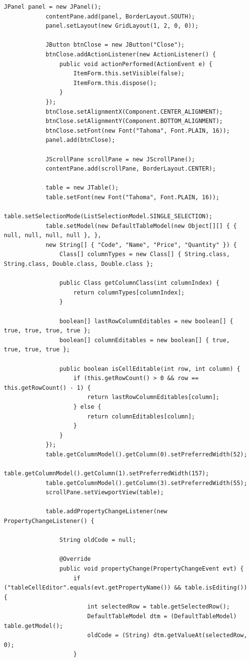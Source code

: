 \begin{lstlisting}[style=JavaStyle]
			JPanel panel = new JPanel();
			contentPane.add(panel, BorderLayout.SOUTH);
			panel.setLayout(new GridLayout(1, 2, 0, 0));
			
			JButton btnClose = new JButton("Close");
			btnClose.addActionListener(new ActionListener() {
				public void actionPerformed(ActionEvent e) {
					ItemForm.this.setVisible(false);
					ItemForm.this.dispose();
				}
			});
			btnClose.setAlignmentX(Component.CENTER_ALIGNMENT);
			btnClose.setAlignmentY(Component.BOTTOM_ALIGNMENT);
			btnClose.setFont(new Font("Tahoma", Font.PLAIN, 16));
			panel.add(btnClose);
			
			JScrollPane scrollPane = new JScrollPane();
			contentPane.add(scrollPane, BorderLayout.CENTER);
			
			table = new JTable();
			table.setFont(new Font("Tahoma", Font.PLAIN, 16));
			table.setSelectionMode(ListSelectionModel.SINGLE_SELECTION);
			table.setModel(new DefaultTableModel(new Object[][] { { null, null, null, null }, },
			new String[] { "Code", "Name", "Price", "Quantity" }) {
				Class[] columnTypes = new Class[] { String.class, String.class, Double.class, Double.class };
				
				public Class getColumnClass(int columnIndex) {
					return columnTypes[columnIndex];
				}
				
				boolean[] lastRowColumnEditables = new boolean[] { true, true, true, true };
				boolean[] columnEditables = new boolean[] { true, true, true, true };
				
				public boolean isCellEditable(int row, int column) {
					if (this.getRowCount() > 0 && row == this.getRowCount() - 1) {
						return lastRowColumnEditables[column];
					} else {
						return columnEditables[column];
					}
				}
			});
			table.getColumnModel().getColumn(0).setPreferredWidth(52);
			table.getColumnModel().getColumn(1).setPreferredWidth(157);
			table.getColumnModel().getColumn(3).setPreferredWidth(55);
			scrollPane.setViewportView(table);
			
			table.addPropertyChangeListener(new PropertyChangeListener() {
				
				String oldCode = null;
				
				@Override
				public void propertyChange(PropertyChangeEvent evt) {
					if ("tableCellEditor".equals(evt.getPropertyName()) && table.isEditing()) {
						int selectedRow = table.getSelectedRow();
						DefaultTableModel dtm = (DefaultTableModel) table.getModel();
						oldCode = (String) dtm.getValueAt(selectedRow, 0);
					}
					

\end{lstlisting}
